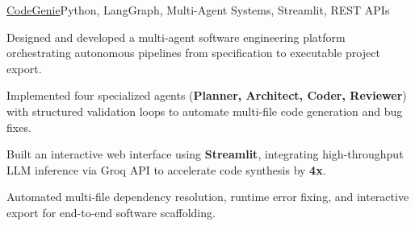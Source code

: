 \begin{cvproject}{\uline{CodeGenie}}{Python, LangGraph, Multi-Agent Systems, Streamlit, REST APIs}
    \item Designed and developed a multi-agent software engineering platform orchestrating autonomous pipelines from specification to executable project export.
    \item Implemented four specialized agents (\textbf{Planner, Architect, Coder, Reviewer}) with structured validation loops to automate multi-file code generation and bug fixes.
    \item Built an interactive web interface using \textbf{Streamlit}, integrating high-throughput LLM inference via Groq API to accelerate code synthesis by \textbf{4x}.
    \item Automated multi-file dependency resolution, runtime error fixing, and interactive export for end-to-end software scaffolding.
\end{cvproject}

